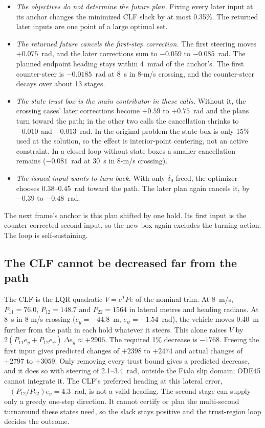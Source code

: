 \documentclass[11pt]{article}
\begin{document}
\begin{itemize}
\item \emph{The objectives do not determine the future plan.} Fixing every
later input at its anchor changes the minimized CLF slack by at most 0.35\%.
The returned later inputs are one point of a large optimal set.
\item \emph{The returned future cancels the first-step correction.} The first
steering moves $+0.075$~rad, and the later corrections sum to $-0.059$ to
$-0.085$~rad. The planned endpoint heading stays within 4~mrad of the anchor's.
The first counter-steer is $-0.0185$~rad at 8~s in 8-m/s crossing, and the
counter-steer decays over about 13 stages.
\item \emph{The state trust box is the main contributor in these calls.}
Without it, the crossing cases' later corrections become $+0.59$ to $+0.75$~rad
and the plans turn toward the path; in the other two calls the cancellation
shrinks to $-0.010$ and $-0.013$~rad. In the original problem the state box is
only 15\% used at the solution, so the effect is interior-point centering, not
an active constraint. In a closed loop without state boxes a smaller
cancellation remains ($-0.081$~rad at 30~s in 8-m/s crossing).
\item \emph{The issued input wants to turn back.} With only $\delta_0$ freed,
the optimizer chooses 0.38--0.45~rad toward the path. The later plan again
cancels it, by $-0.39$ to $-0.48$~rad.
\end{itemize}
The next frame's anchor is this plan shifted by one hold. Its first input is
the counter-corrected second input, so the new box again excludes the turning
action. The loop is self-sustaining.

\subsection{The CLF cannot be decreased far from the path}
The CLF is the LQR quadratic $V=e^TPe$ of the nominal trim. At 8~m/s,
$P_{11}=76.0$, $P_{12}=148.7$ and $P_{22}=1564$ in lateral metres and heading
radians. At 8~s in 8-m/s crossing ($e_y=-44.8$~m, $e_\psi=-1.54$~rad), the
vehicle moves 0.40~m further from the path in each hold whatever it steers.
This alone raises $V$ by $2(P_{11}e_y+P_{12}e_\psi)\,\Delta e_y\approx+2906$. The
required 1\% decrease is $-1768$. Freeing the first input gives predicted
changes of $+2398$ to $+2474$ and actual changes of $+2797$ to $+3059$. Only removing every trust
bound gives a predicted decrease, and it does so with steering of 2.1--3.4~rad,
outside the Fiala slip domain; ODE45 cannot integrate it. The CLF's preferred
heading at this lateral error, $-(P_{12}/P_{22})e_y=4.3$~rad, is not a valid
heading. The second stage can supply only a greedy one-step direction. It cannot
certify or plan the multi-second turnaround these states need, so the slack
stays positive and the trust-region loop decides the outcome.
\end{document}

